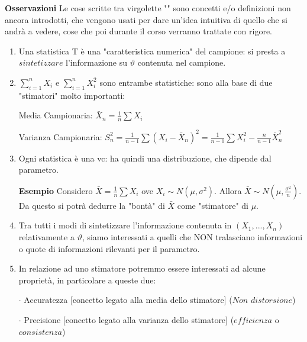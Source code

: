 \textbf{Osservazioni}
Le cose scritte tra virgolette "" sono concetti e/o definizioni non ancora introdotti, che vengono usati per dare un'idea intuitiva di quello che si andrà a vedere, cose che poi durante il corso verranno trattate con rigore.
\begin{enumerate}
\item Una statistica T è una "caratteristica numerica" del campione: si presta a $sintetizzare$ l'informazione su $\vartheta$ contenuta nel campione.
\item $\sum_{i=1}^n X_i$ e $\sum_{i=1}^n X_i^2$ sono entrambe statistiche: sono alla base di due "stimatori" molto importanti:

Media Campionaria: $\bar{X}_n =\frac{1}{n}\sum X_i$

Varianza Campionaria: $S_n^2=\frac{1}{n-1} \sum (X_i-\bar{X}_n)^2 = \frac{1}{n-1} \sum X_i^2 - \frac{n}{n-1}\bar{X}_n^2$
\item Ogni statistica è una vc: ha quindi una distribuzione, che dipende dal parametro.

\textbf{Esempio} Considero $\bar{X}=\frac{1}{n} \sum X_i$ ove $X_i \sim N(\mu,\sigma^2)$. Allora $\bar{X} \sim N(\mu,\frac{\sigma^2}{n})$. Da questo si potrà dedurre la "bontà" di $\bar{X}$ come "stimatore" di $\mu$.
\item Tra tutti i modi di sintetizzare l'informazione contenuta in $(X_1,...,X_n)$ relativamente a $\vartheta$, siamo interessati a quelli che NON tralasciano informazioni o quote di informazioni rilevanti per il parametro.
\item In relazione ad uno stimatore potremmo essere interessati ad alcune proprietà, in particolare a queste due:

$\cdot$ Accuratezza [concetto legato alla media dello stimatore] ($Non$ $distorsione$)

$\cdot$ Precisione [concetto legato alla varianza dello stimatore] ($efficienza$ o $consistenza$)
\end{enumerate}

